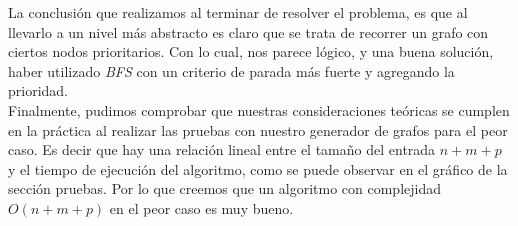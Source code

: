 La conclusión que realizamos al terminar de resolver el problema, es que al llevarlo a un nivel más abstracto es claro que se trata de recorrer un grafo con ciertos nodos prioritarios. Con lo cual, nos parece lógico, y una buena solución, haber utilizado \textit{BFS} con un criterio de parada más fuerte y agregando la prioridad. \\

Finalmente, pudimos comprobar que nuestras consideraciones teóricas se cumplen en la práctica al realizar las pruebas con nuestro generador de grafos para el peor caso. Es decir que hay una relación lineal entre el tamaño del entrada $n+m+p$ y el tiempo de ejecución del algoritmo, como se puede observar en el gráfico de la sección pruebas. Por lo que creemos que un algoritmo con complejidad $O(n+m+p)$ en el peor caso es muy bueno.\\
